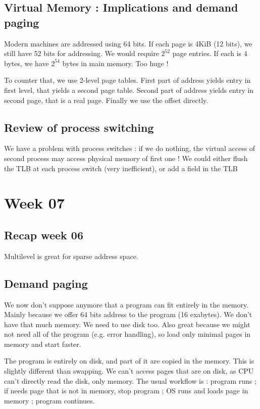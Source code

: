 \documentclass[12pt,a4paper]{article}
\begin{document}
\subsection{Virtual Memory : Implications and demand paging}
Modern machines are addressed using 64 bits. If each page is 4KiB (12 bits), we still have 52 bits for addressing. We would require $2^{52}$ page entries. If each is 4 bytes, we have $2^{54}$ bytes in main memory. Too huge !

To counter that, we use 2-level page tables. First part of address yields entry in first level, that yields a second page table. Second part of address yields entry in second page, that is a real page. Finally we use the offset directly. 

\subsection{Review of process switching}
We have a problem with process switches : if we do nothing, the virtual access of second process may access physical memory of first one ! We could either flush the TLB at each process switch (very inefficient), or add a field in the TLB 

\section{Week 07}
\subsection{Recap week 06}
Multilevel is great for sparse address space.

\subsection{Demand paging}
We now don't suppose anymore that a program can fit entirely in the memory. Mainly because we offer 64 bits address to the program (16 exabytes). We don't have that much memory. We need to use disk too. Also great because we might not need all of the program (e.g. error handling), so load only minimal pages in memory and start faster. 

The program is entirely on disk, and part of it are copied in the memory. This is slightly different than swapping. We can't access pages that are on disk, as CPU can't directly read the disk, only memory. The usual workflow is : program runs ; if needs page that is not in memory, stop program ; OS runs and loads page in memory ; program continues. 
\end{document}
